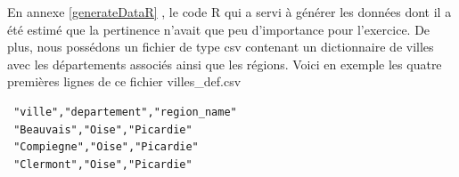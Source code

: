 En annexe \ref{generateDataR} , le code R qui a servi à générer les données dont il a été estimé que la pertinence n'avait que peu d'importance pour l'exercice.
De plus, nous possédons un fichier de type csv contenant un dictionnaire de villes avec les départements associés ainsi que les régions.
Voici en exemple les quatre premières lignes de ce fichier villes\_def.csv

\lstset{language=bash}
\lstset{frame=shadowbox}
\begin{lstlisting}
 "ville","departement","region_name"
 "Beauvais","Oise","Picardie"
 "Compiegne","Oise","Picardie"
 "Clermont","Oise","Picardie"
\end{lstlisting}

\clearpage


